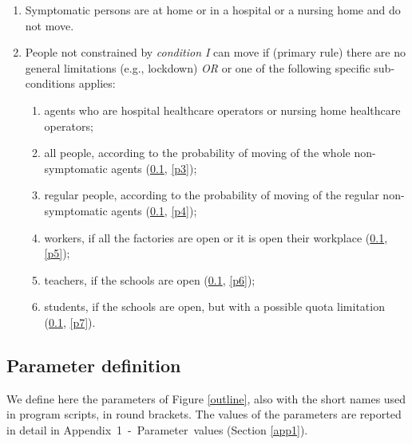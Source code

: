 \documentclass[graybox]{svmult}
\begin{document}
\begin{enumerate}[label=\Roman*]

\item Symptomatic persons are at home or in a hospital or a nursing home and do not move. 

\item People not constrained by \emph{condition I} can move if (primary rule) there are no general limitations (e.g., lockdown) \emph{OR} or one of the following specific sub-conditions applies:

\begin{enumerate}
\item agents who are hospital healthcare operators or nursing home healthcare operators;

\item all people, according to the probability of moving of the whole non-symptomatic agents (\ref{par}, \ref{p3});

\item regular people, according to the probability of moving of the regular non-symptomatic agents
(\ref{par}, \ref{p4});

\item workers, if all the factories are open or it is open their workplace
(\ref{par}, \ref{p5});

\item teachers, if the schools are open
(\ref{par}, \ref{p6});

\item students, if the schools are open, but with a possible quota limitation
(\ref{par}, \ref{p7}).

\end{enumerate}

\end{enumerate}


\subsection{Parameter definition}
\label{par}

We define here the parameters of Figure \ref{outline}, also with the short names used in program scripts, in round brackets. The values of the parameters are reported in detail in Appendix~1~-~Parameter~values (Section \ref{app1}).
\end{document}
